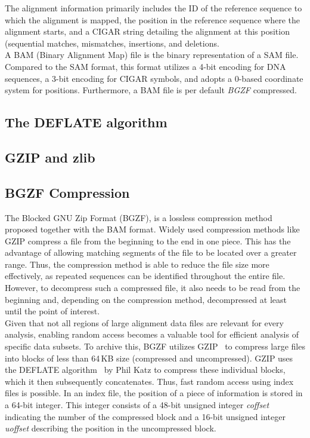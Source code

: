 The alignment information primarily includes the ID of the reference sequence to which the alignment is mapped, the position in the reference sequence where the alignment starts, and a CIGAR string detailing the alignment at this position (sequential matches, mismatches, insertions, and deletions. \\

A BAM (Binary Alignment Map) file is the binary representation of a SAM file. Compared to the SAM format, this format utilizes a 4-bit encoding for DNA sequences, a 3-bit encoding for CIGAR symbols, and adopts a 0-based coordinate system for positions. Furthermore, a BAM file is per default \textit{BGZF} compressed.

\subsection{The DEFLATE algorithm}

\subsection{GZIP and zlib}

\subsection{BGZF Compression} \label{bgzf}
The Blocked GNU Zip Format (BGZF), is a lossless compression method proposed together with the BAM format. Widely used compression methods like GZIP compress a file from the beginning to the end in one piece. This has the advantage of allowing matching segments of the file to be located over a greater range. Thus, the compression method is able to reduce the file size more effectively, as repeated sequences can be identified throughout the entire file. However, to decompress such a compressed file, it also needs to be read from the beginning and, depending on the compression method, decompressed at least until the point of interest. \\

Given that not all regions of large alignment data files are relevant for every analysis, enabling random access becomes a valuable tool for efficient analysis of specific data subsets. To archive this, BGZF utilizes GZIP~\cite{gzip} to compress large files into blocks of less than 64\,KB size (compressed and uncompressed). GZIP uses the DEFLATE algorithm~\cite{deflate} by Phil Katz to compress these individual blocks, which it then subsequently concatenates. Thus, fast random access using index files is possible. In an index file, the position of a piece of information is stored in a 64-bit integer. This integer consists of a 48-bit unsigned integer \textit{coffset} indicating the number of the compressed block and a 16-bit unsigned integer \textit{uoffset} describing the position in the uncompressed block. \\


